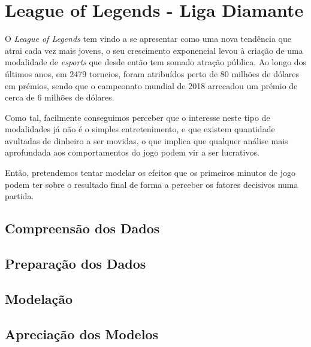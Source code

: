 \section{League of Legends - Liga Diamante}

O \textit{League of Legends} tem vindo a se apresentar como uma nova tendência que atrai cada vez mais jovens, o seu crescimento exponencial levou à criação de uma modalidade de \textit{esports} que desde então tem somado atração pública. Ao longo dos últimos anos, em 2479 torneios, foram atribuídos perto de 80 milhões de dólares em prémios, sendo que o campeonato mundial de 2018 arrecadou um prémio de cerca de 6 milhões de dólares.

Como tal, facilmente conseguimos perceber que o interesse neste tipo de modalidades já não é o simples entretenimento, e que existem quantidade avultadas de dinheiro a ser movidas, o que implica que qualquer análise mais aprofundada aos comportamentos do jogo podem vir a ser lucrativos.

Então, pretendemos tentar modelar os efeitos que os primeiros minutos de jogo podem ter sobre o resultado final de forma a perceber os fatores decisivos numa partida.

\subsection{Compreensão dos Dados}


\subsection{Preparação dos Dados}


\subsection{Modelação}


\subsection{Apreciação dos Modelos}
